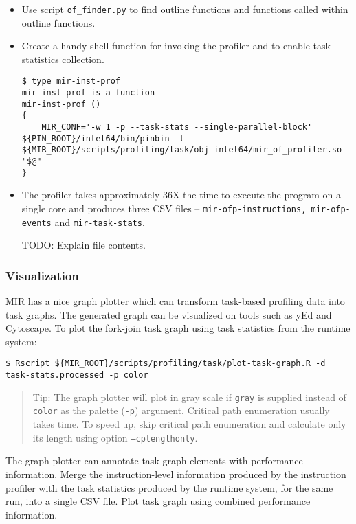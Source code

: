 \documentclass[11pt,a4paper]{article}
\begin{document}
\begin{itemize}
\item Use script \texttt{of\_finder.py} to find outline functions and functions called within outline functions.

\item Create a handy shell function for invoking the profiler and to enable task statistics collection.

\begin{lstlisting}[style=MyInputStyle]
$ type mir-inst-prof 
mir-inst-prof is a function
mir-inst-prof () 
{ 
    MIR_CONF='-w 1 -p --task-stats --single-parallel-block' ${PIN_ROOT}/intel64/bin/pinbin -t ${MIR_ROOT}/scripts/profiling/task/obj-intel64/mir_of_profiler.so "$@"
}
\end{lstlisting}

\item The profiler takes approximately 36X  the time to execute the program on a single core and produces three CSV files -- \texttt{mir-ofp-instructions, mir-ofp-events} and \texttt{mir-task-stats}.

TODO: Explain file contents.

\end{itemize}

\subsubsection{Visualization}

MIR has a nice graph plotter which can transform task-based profiling data into task graphs. The generated graph can be visualized on tools such as yEd and Cytoscape.  To plot the fork-join task graph using task statistics from the runtime system:

\begin{lstlisting}[style=MyInputStyle]
$ Rscript ${MIR_ROOT}/scripts/profiling/task/plot-task-graph.R -d task-stats.processed -p color
\end{lstlisting}

\begin{framed}
\begin{quote}
Tip: The graph plotter will plot in gray scale if \texttt{gray} is supplied instead of \texttt{color} as the palette (\texttt{-p}) argument. Critical path enumeration usually takes time. To speed up, skip critical path enumeration and calculate only its length using option \texttt{--cplengthonly}.
\end{quote}
\end{framed}

The graph plotter can annotate task graph elements with performance information. Merge the instruction-level information produced by the instruction profiler with the task statistics produced by the runtime system, for the same run, into a single CSV file. Plot task graph using combined performance information.
\end{document}
